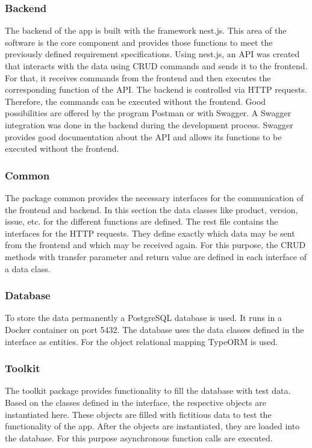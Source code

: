     \subsubsection*{Backend}
    The backend of the app is built with the framework nest.js. This area of the software is the core component and provides those functions to meet the previously defined requirement specifications. Using nest.js, an API was created that interacts with the data using CRUD commands and sends it to the frontend. For that, it receives commands from the frontend and then executes the corresponding function of the API. The backend is controlled via HTTP requests. Therefore, the commands can be executed without the frontend. Good possibilities are offered by the program Postman or with Swagger. A Swagger integration was done in the backend during the development process. Swagger provides good documentation about the API and allows its functions to be executed without the frontend.

    \subsubsection*{Common}
    The package common provides the necessary interfaces for the communication of the frontend and backend. In this section the data classes like product, version, issue, etc. for the different functions are defined. 
    The rest file contains the interfaces for the HTTP requests. They define exactly which data may be sent from the frontend and which may be received again. For this purpose, the CRUD methods with transfer parameter and return value are defined in each interface of a data class.
    
    \subsubsection*{Database}
    To store the data permanently a PostgreSQL database is used. It runs in a Docker container on port 5432. The database uses the data classes defined in the interface as entities. For the object relational mapping TypeORM is used. 
    
    \subsubsection*{Toolkit}
    The toolkit package provides functionality to fill the database with test data. Based on the classes defined in the interface, the respective objects are instantiated here. These objects are filled with fictitious data to test the functionality of the app. After the objects are instantiated, they are loaded into the database. For this purpose asynchronous function calls are executed.

